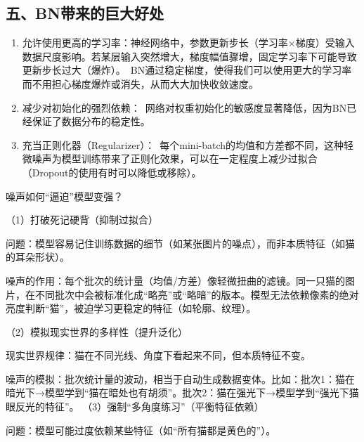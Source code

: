 \hypertarget{ux4e94bnux5e26ux6765ux7684ux5de8ux5927ux597dux5904}{%
\subsection{五、BN带来的巨大好处}\label{ux4e94bnux5e26ux6765ux7684ux5de8ux5927ux597dux5904}}

\begin{enumerate}
\def\labelenumi{\arabic{enumi}.}
\item
  允许使用更高的学习率：神经网络中，参数更新步长（学习率×梯度）受输入数据尺度影响。若某层输入突然增大，梯度幅值骤增，固定学习率下可能导致更新步长过大（爆炸）。~BN通过稳定梯度，使得我们可以使用更大的学习率而不用担心梯度爆炸或消失，从而大大加快收敛速度。
\item
  减少对初始化的强烈依赖：~网络对权重初始化的敏感度显著降低，因为BN已经保证了数据分布的稳定性。
\item
  充当正则化器（Regularizer）：~每个mini-batch的均值和方差都不同，这种轻微噪声为模型训练带来了正则化效果，可以在一定程度上减少过拟合（Dropout的使用有时可以降低或移除）。
\end{enumerate}

噪声如何``逼迫''模型变强？\hspace{0pt}\hspace{0pt}

（1）打破死记硬背（抑制过拟合）\hspace{0pt}\hspace{0pt}

问题：模型容易记住训练数据的细节（如某张图片的噪点），而非本质特征（如猫的耳朵形状）。

噪声的作用：每个批次的统计量（均值/方差）像轻微扭曲的滤镜。同一只猫的图片，在不同批次中会被标准化成``略亮''或``略暗''的版本。模型无法依赖像素的绝对亮度判断``猫''，被迫学习更稳定的特征（如轮廓、纹理）。

（2）模拟现实世界的多样性（提升泛化）\hspace{0pt}\hspace{0pt}

现实世界规律：猫在不同光线、角度下看起来不同，但本质特征不变。

噪声的模拟：批次统计量的波动，相当于自动生成数据变体。比如：批次1：猫在暗光下→模型学到``猫在暗处也有胡须''。批次2：猫在强光下→模型学到``强光下猫眼反光的特征''。
（3）强制``多角度练习''（平衡特征依赖）\hspace{0pt}\hspace{0pt}

问题：模型可能过度依赖某些特征（如``所有猫都是黄色的''）。


